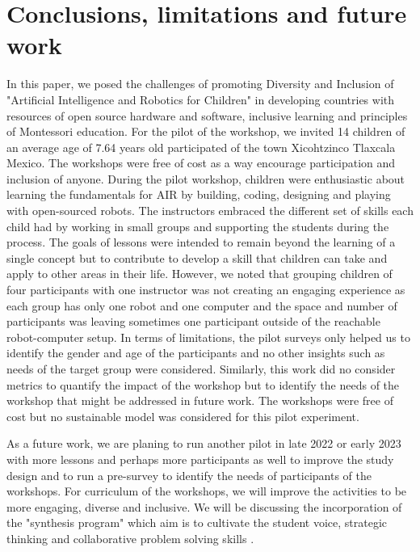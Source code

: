 \documentclass[conference]{IEEEtran}
\begin{document}
\section{Conclusions, limitations and future work}
In this paper, we posed the challenges of promoting Diversity and Inclusion of "Artificial Intelligence and Robotics for Children" in developing countries with resources of open source hardware and software, inclusive learning and principles of Montessori education. 
For the pilot of the workshop, we invited 14 children of an average age of 7.64 years old participated of the town Xicohtzinco Tlaxcala Mexico.
The workshops were free of cost as a way encourage participation and inclusion of anyone. 
During the pilot workshop, children were enthusiastic about learning the fundamentals for AIR by building, coding, designing and playing with open-sourced robots. 
The instructors embraced the different set of skills each child had by working in small groups and supporting the students during the process. 
The goals of lessons were intended to remain beyond the learning of a single concept but to contribute to develop a skill that children can take and apply to other areas in their life.
However, we noted that grouping children of four participants with one instructor was not creating an engaging experience as each group has only one robot and one computer and the space and number of participants was leaving sometimes one participant outside of the reachable robot-computer setup.
In terms of limitations, the pilot surveys only helped us to identify the gender and age of the participants and no other insights such as needs of the target group were considered.
Similarly, this work did no consider metrics to quantify the impact of the workshop but to identify the needs of the workshop that might be addressed in future work.
The workshops were free of cost but no sustainable model was considered for this pilot experiment.

As a future work, we are planing to run another pilot in late 2022 or early 2023 with more lessons and perhaps more participants as well to improve the study design and to run a pre-survey to identify the needs of participants of the workshops.
For curriculum of the workshops, we will improve the activities to be more engaging, diverse and inclusive. 
We will be discussing the incorporation of the "synthesis program" which aim is to cultivate the student voice, strategic thinking and collaborative problem solving skills \cite{synthesis2022}.
\end{document}
